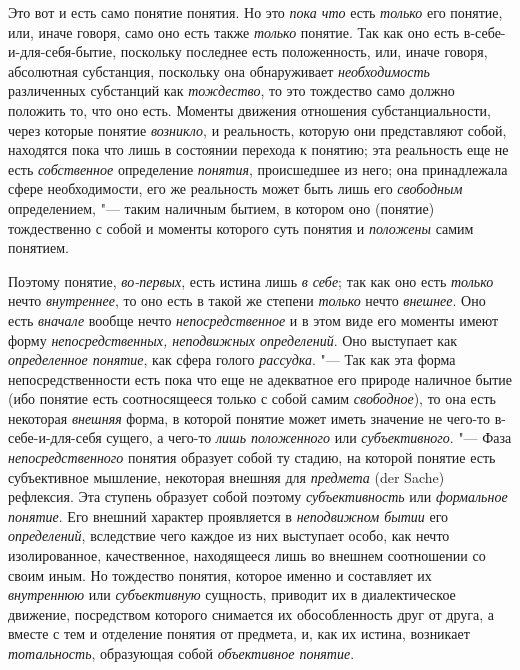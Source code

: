 {Это вот и есть само понятие понятия. Но это
{\em пока что} есть
{\em только} его понятие,
или, иначе говоря, само оно есть также
{\em только} понятие. Так
как оно есть в-себе-и-для-себя-бытие, поскольку последнее есть
положенность, или, иначе говоря, абсолютная субстанция, поскольку она
обнаруживает {\em необходимость}
различенных субстанций как
{\em тождество}, то это
тождество само должно положить то, что оно есть. Моменты движения отношения
субстанциальности, через которые понятие
{\em возникло}, и
реальность, которую они представляют собой, находятся пока что лишь в
состоянии перехода к понятию; эта реальность еще не есть
{\em собственное}
определение
{\em понятия},
происшедшее из него; она принадлежала сфере необходимости,
его же реальность может быть лишь его
{\em свободным}
определением, "--- таким наличным бытием, в
котором оно (понятие) тождественно с собой и моменты которого суть понятия
и {\em положены} самим
понятием.

Поэтому понятие,
{\em во-первых}, есть
истина лишь {\em в себе};
так как оно есть
{\em только} нечто
{\em внутреннее}, то оно
есть в такой же степени {\em только}
нечто {\em внешнее}.
Оно есть {\em вначале}
вообще нечто
{\em непосредственное} и
в этом виде его моменты имеют форму
{\em непосредственных, неподвижных
определений}. Оно выступает как
{\em определенное понятие},
как сфера голого
{\em рассудка}. "--- Так как
эта форма непосредственности есть пока что еще не адекватное его природе
наличное бытие (ибо понятие есть соотносящееся только с собой самим
{\em свободное}), то она
есть некоторая {\em внешняя}
форма, в которой понятие может иметь значение не чего-то
в-себе-и-для-себя сущего, а чего-то
{\em лишь положенного}
или {\em субъективного}.
"--- Фаза
{\em непосредственного}
понятия образует собой ту стадию, на которой понятие есть
субъективное мышление, некоторая внешняя для
{\em предмета} (der Sache)
рефлексия. Эта ступень образует собой поэтому
{\em субъективность} или
{\em формальное понятие}.
Его внешний характер проявляется в
{\em неподвижном бытии}
его {\em определений},
вследствие чего каждое из них выступает особо, как нечто
изолированное, качественное, находящееся лишь во внешнем соотношении со
своим иным. Но тождество понятия, которое именно и составляет их
{\em внутреннюю} или
{\em субъективную}
сущность, приводит их в диалектическое движение, посредством
которого снимается их обособленность друг от друга, а вместе с тем и
отделение понятия от предмета, и, как их истина, возникает
{\em тотальность},
образующая собой
{\em объективное понятие}.

}
